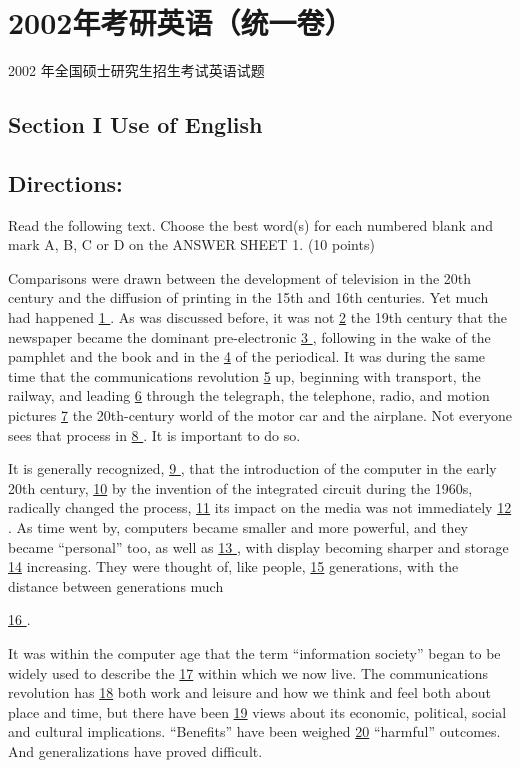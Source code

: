 \documentclass[UTF8,11pt]{ctexart}
\begin{document}
\section*{2002年考研英语（统一卷）}
2002 年全国硕士研究生招生考试英语试题


\subsection*{\textbf{Section I Use of English}}


\subsection*{\textbf{Directions:}}


Read the following text. Choose the best word(s) for each numbered blank and mark A, B, C or D on the ANSWER SHEET 1. (10 points)


Comparisons were drawn between the development of television in the 20th century and the diffusion of printing in the 15th and 16th centuries. Yet much had happened \uline{1 }. As was discussed before, it was not \uline{2} the 19th century that the newspaper became the dominant pre-electronic \uline{3 }, following in the wake of the pamphlet and the book and in the \uline{4} of the periodical. It was during the same time that the communications revolution \uline{5} up, beginning with transport, the railway, and leading \uline{6} through the telegraph, the telephone, radio, and motion pictures \uline{7} the 20th-century world of the motor car and the airplane. Not everyone sees that process in \uline{8 }. It is important to do so.


It is generally recognized, \uline{9 }, that the introduction of the computer in the early 20th century, \uline{10} by the invention of the integrated circuit during the 1960s, radically changed the process, \uline{11} its impact on the media was not immediately \uline{12 }. As time went by, computers became smaller and more powerful, and they became “personal” too, as well as \uline{13 }, with display becoming sharper and storage \uline{14} increasing. They were thought of, like people, \uline{15} generations, with the distance between generations much


\uline{16 }.


It was within the computer age that the term “information society” began to be widely used to describe the \uline{17} within which we now live. The communications revolution has \uline{18} both work and leisure and how we think and feel both about place and time, but there have been \uline{19} views about its economic, political, social and cultural implications. “Benefits” have been weighed \uline{20} “harmful” outcomes. And generalizations have proved difficult.
\end{document}
